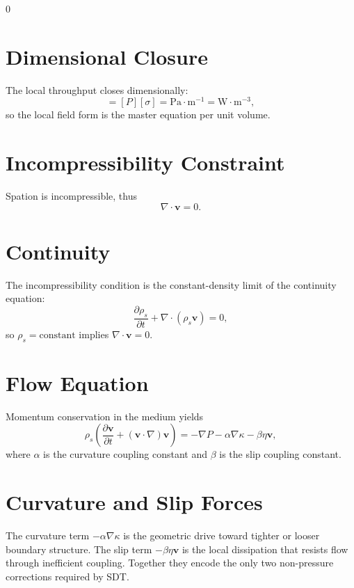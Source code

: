 0\documentclass[12pt]{book}
\begin{document}
\section{Dimensional Closure}
The local throughput closes dimensionally:
\begin{equation}
[\dot{e}] = [P][\sigma] = \text{Pa}\cdot\text{m}^{-1} = \text{W}\cdot\text{m}^{-3},
\end{equation}
so the local field form is the master equation per unit volume.

\section{Incompressibility Constraint}
Spation is incompressible, thus
\begin{equation}
\nabla \cdot \mathbf{v} = 0.
\end{equation}

\section{Continuity}
The incompressibility condition is the constant-density limit of the continuity equation:
\begin{equation}
\frac{\partial \rho_s}{\partial t} + \nabla \cdot (\rho_s \mathbf{v}) = 0,
\end{equation}
so $\rho_s = \text{constant}$ implies $\nabla\cdot\mathbf{v}=0$.

\section{Flow Equation}
Momentum conservation in the medium yields
\begin{equation}
\rho_s\left(\frac{\partial \mathbf{v}}{\partial t} + (\mathbf{v}\cdot\nabla)\mathbf{v}\right)
  = -\nabla P - \alpha\nabla\kappa - \beta \eta \mathbf{v},
\end{equation}
where $\alpha$ is the curvature coupling constant and $\beta$ is the slip coupling constant.

\section{Curvature and Slip Forces}
The curvature term $-\alpha\nabla\kappa$ is the geometric drive toward tighter or looser boundary
structure. The slip term $-\beta \eta \mathbf{v}$ is the local dissipation that resists flow through
inefficient coupling. Together they encode the only two non-pressure corrections required by SDT.
\end{document}
